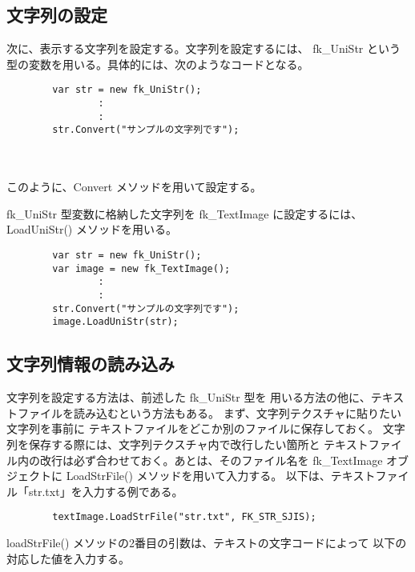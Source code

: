 \subsection{文字列の設定} \label{subsec:strDef}
次に、表示する文字列を設定する。文字列を設定するには、
fk\_UniStr という型の変数を用いる。具体的には、次のようなコードとなる。
\\
\begin{screen}
\begin{verbatim}
        var str = new fk_UniStr();
                :
                :
        str.Convert("サンプルの文字列です");
\end{verbatim}
\end{screen} \\ ~ \\
このように、Convert メソッドを用いて設定する。

fk\_UniStr 型変数に格納した文字列を
fk\_TextImage に設定するには、LoadUniStr() メソッドを用いる。
\\
\begin{screen}
\begin{verbatim}
        var str = new fk_UniStr();
        var image = new fk_TextImage();
                :
                :
        str.Convert("サンプルの文字列です");
        image.LoadUniStr(str);
\end{verbatim}
\end{screen}

\subsection{文字列情報の読み込み}
文字列を設定する方法は、前述した fk\_UniStr 型を
用いる方法の他に、テキストファイルを読み込むという方法もある。
まず、文字列テクスチャに貼りたい文字列を事前に
テキストファイルをどこか別のファイルに保存しておく。
文字列を保存する際には、文字列テクスチャ内で改行したい箇所と
テキストファイル内の改行は必ず合わせておく。あとは、そのファイル名を
fk\_TextImage オブジェクトに LoadStrFile() メソッドを用いて入力する。
以下は、テキストファイル「str.txt」を入力する例である。
\\
\begin{screen}
\begin{verbatim}
        textImage.LoadStrFile("str.txt", FK_STR_SJIS);
\end{verbatim}
\end{screen}
loadStrFile() メソッドの2番目の引数は、テキストの文字コードによって
以下の対応した値を入力する。

